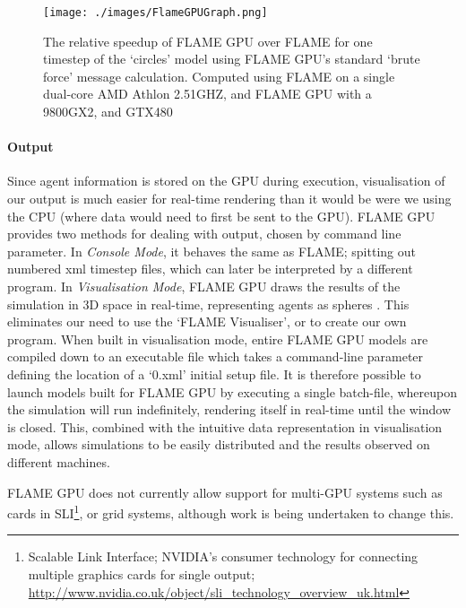 \documentclass[11pt,a4paper]{article}
\begin{document}
\begin{figure}[H]
  \centering
  \texttt{[image: ./images/FlameGPUGraph.png]}
  \caption[Relative speedup of FLAME GPU over FLAME]{The relative speedup of FLAME GPU over FLAME for one timestep of the `circles' model using FLAME GPU's standard `brute force' message calculation. Computed using FLAME on a single dual-core AMD Athlon 2.51GHZ, and FLAME GPU with a 9800GX2, and GTX480 \cite{emeraldGPU}}
  \label{flamePerformanceGraph}
\end{figure}

\paragraph{Output}
Since agent information is stored on the GPU during execution, visualisation of our output is much easier for real-time rendering than it would be were we using the CPU (where data would need to first be sent to the GPU). FLAME GPU provides two methods for dealing with output, chosen by command line parameter. In \emph{Console Mode}, it behaves the same as FLAME; spitting out numbered xml timestep files, which can later be interpreted by a different program. In \emph{Visualisation Mode}, FLAME GPU draws the results of the simulation in 3D space in real-time, representing agents as spheres \cite{fgpuTechnical}. This eliminates our need to use the `FLAME Visualiser', or to create our own program. When built in visualisation mode, entire FLAME GPU models are compiled down to an executable file which takes a command-line parameter defining the location of a `0.xml' initial setup file. It is therefore possible to launch models built for FLAME GPU by executing a single batch-file, whereupon the simulation will run indefinitely, rendering itself in real-time until the window is closed. This, combined with the intuitive data representation in visualisation mode, allows simulations to be easily distributed and the results observed on different machines.

FLAME GPU does not currently allow support for multi-GPU systems such as cards in SLI\footnote{Scalable Link Interface; NVIDIA's consumer technology for connecting multiple graphics cards for single output; \url{http://www.nvidia.co.uk/object/sli_technology_overview_uk.html}}, or grid systems, although work is being undertaken to change this.
\end{document}
